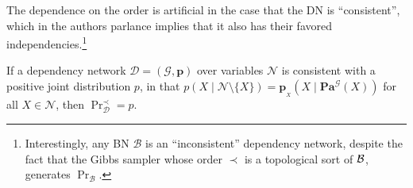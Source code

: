 \documentclass[letterpaper]{article} %
\theoremstyle{plain}
\theoremstyle{definition}
\theoremstyle{remark}
\newcommand{\begthm}[3][]{\begin{#2}[{name=#1},restate=#3,label=#3]}
\newcommand\mat[1]{\mathbf{#1}}
\newcommand{\bp}[1][L]{\mat{p}_{\!_{#1}\!}}
\newcommand{\N}{\mathcal N}
\newcommand\Pa{\mathbf{Pa}}
\newcommand{\Gr}{\mathcal G}
\begin{document}
{%
%
%

The dependence on the order is artificial in the case that the DN is ``consistent'', which in the authors parlance implies that it also has their favored independencies.\footnote{Interestingly, any BN $\mathcal B$ is an ``inconsistent'' dependency network, despite the fact that the Gibbs sampler whose order $\prec$ is a topological sort  of $\cal B$, generates $\Pr_{\mathcal B}$.}

\begthm[\citeauthor{heckerman2000dependency}]{theorem}{thm:dns-uniq}
If a dependency network $\mathcal D \!=\! (\Gr, \mat p)$ over variables $\N$ is consistent with a positive joint distribution $p$,
in that $p(X \mid \N\setminus \{X\}) = \bp[X](X \mid \Pa^{\Gr}(X))$ for all $X \in \N$,
 then $\Pr_{\mathcal D}^\prec = p$.
\end{theorem}

}
\end{document}
